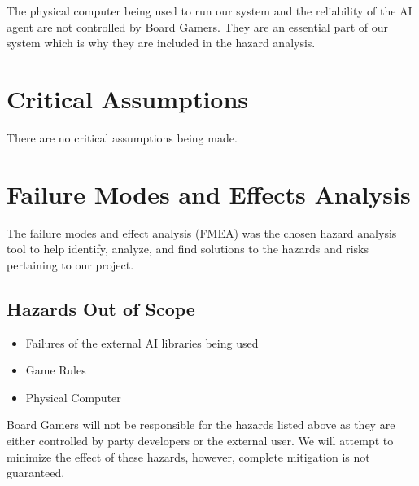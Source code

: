 \documentclass{article}
\begin{document}
The physical computer being used to run our system and the reliability of the AI agent are not controlled by Board Gamers. They are an essential part of our system which is why they are included in the hazard analysis.

\section{Critical Assumptions}
There are no critical assumptions being made.

\section{Failure Modes and Effects Analysis}
The failure modes and effect analysis (FMEA) was the chosen hazard analysis tool to help identify, analyze, and find solutions to the hazards and risks pertaining to our project.
\subsection{Hazards Out of Scope}
\begin{itemize}
    \item Failures of the external AI libraries being used
    \item Game Rules
    \item Physical Computer
\end{itemize}
Board Gamers will not be responsible for the hazards listed above as they are either controlled by  party developers or the external user. We will attempt to minimize the effect of these hazards, however, complete mitigation is not guaranteed.
\end{document}
